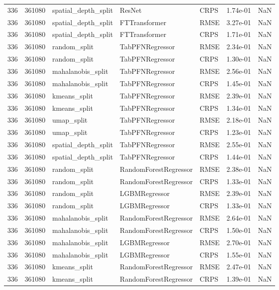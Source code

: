 \begin{tabular}{rrlllrr}
336 & 361080 & spatial\_depth\_split & ResNet & CRPS & 1.74e-01 & NaN \\
336 & 361080 & spatial\_depth\_split & FTTransformer & RMSE & 3.27e-01 & NaN \\
336 & 361080 & spatial\_depth\_split & FTTransformer & CRPS & 1.71e-01 & NaN \\
336 & 361080 & random\_split & TabPFNRegressor & RMSE & 2.34e-01 & NaN \\
336 & 361080 & random\_split & TabPFNRegressor & CRPS & 1.30e-01 & NaN \\
336 & 361080 & mahalanobis\_split & TabPFNRegressor & RMSE & 2.56e-01 & NaN \\
336 & 361080 & mahalanobis\_split & TabPFNRegressor & CRPS & 1.45e-01 & NaN \\
336 & 361080 & kmeans\_split & TabPFNRegressor & RMSE & 2.39e-01 & NaN \\
336 & 361080 & kmeans\_split & TabPFNRegressor & CRPS & 1.34e-01 & NaN \\
336 & 361080 & umap\_split & TabPFNRegressor & RMSE & 2.18e-01 & NaN \\
336 & 361080 & umap\_split & TabPFNRegressor & CRPS & 1.23e-01 & NaN \\
336 & 361080 & spatial\_depth\_split & TabPFNRegressor & RMSE & 2.55e-01 & NaN \\
336 & 361080 & spatial\_depth\_split & TabPFNRegressor & CRPS & 1.44e-01 & NaN \\
336 & 361080 & random\_split & RandomForestRegressor & RMSE & 2.38e-01 & NaN \\
336 & 361080 & random\_split & RandomForestRegressor & CRPS & 1.33e-01 & NaN \\
336 & 361080 & random\_split & LGBMRegressor & RMSE & 2.39e-01 & NaN \\
336 & 361080 & random\_split & LGBMRegressor & CRPS & 1.33e-01 & NaN \\
336 & 361080 & mahalanobis\_split & RandomForestRegressor & RMSE & 2.64e-01 & NaN \\
336 & 361080 & mahalanobis\_split & RandomForestRegressor & CRPS & 1.50e-01 & NaN \\
336 & 361080 & mahalanobis\_split & LGBMRegressor & RMSE & 2.70e-01 & NaN \\
336 & 361080 & mahalanobis\_split & LGBMRegressor & CRPS & 1.55e-01 & NaN \\
336 & 361080 & kmeans\_split & RandomForestRegressor & RMSE & 2.47e-01 & NaN \\
336 & 361080 & kmeans\_split & RandomForestRegressor & CRPS & 1.39e-01 & NaN \\

\end{tabular}
